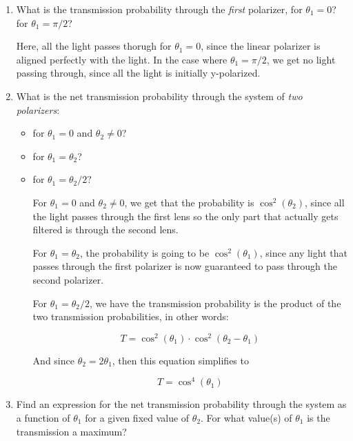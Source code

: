 \documentclass[10pt]{article}
\begin{document}
    \begin{enumerate}
        \item What is the transmission probability through the \textit{first} polarizer, for $\theta_1 = 0$? for $\theta_1 = \pi/2$?
        
        \begin{solution}
            Here, all the light passes thorugh for $\theta_1 = 0$, since the linear polarizer is aligned perfectly with the light. In the case where $\theta_1 = \pi/2$, we get no light passing through, since all the light is initially y-polarized.
        \end{solution}
        \item What is the net transmission probability through the system of \textit{two polarizers}: 
        \begin{itemize}
            \item for $\theta_1 = 0$ and $\theta_2 \neq 0$?
            \item for $\theta_1 = \theta_2$?
            \item for $\theta_1 = \theta_2/2$?
            
            \begin{solution}
                For $\theta_1 = 0$ and $\theta_2 \neq 0$, we get that the probability is $\cos^2(\theta_2)$, since all the light passes through the first lens so the only part that actually gets filtered is through the second lens.

                For $\theta_1 = \theta_2$, the probability is going to be $\cos^2(\theta_1)$, since any light that passes through the first polarizer is now guaranteed to pass through the second polarizer.

                For $\theta_1 = \theta_2/2$, we have the transmission probability is the product of the two transmission probabilities, in other words: 
                
                \[ T = \cos^2(\theta_1) \cdot \cos^2(\theta_2 - \theta_1)\]

                And since $\theta_2 = 2\theta_1$, then this equation simplifies to 

                \[ T = \cos^4(\theta_1)\]
            \end{solution}
        \end{itemize}
        \item Find an expression for the net transmission probability through the system as a function of $\theta_1$ for a given fixed value of $\theta_2$. For what value(s) of $\theta_1$ is the transmission a maximum?
        

\end{enumerate}
\end{document}
